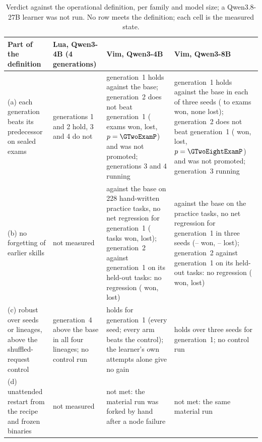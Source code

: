 \begin{table}[htbp]
\centering\footnotesize
\setlength{\tabcolsep}{4pt}
\begin{tabular}{@{}>{\raggedright\arraybackslash}p{36mm}>{\raggedright\arraybackslash}p{38mm}>{\raggedright\arraybackslash}p{38mm}>{\raggedright\arraybackslash}p{36mm}@{}}
\toprule
Part of the definition & Lua, Qwen3-4B (4 generations) & Vim, Qwen3-4B & Vim, Qwen3-8B \\
\midrule
(a) each generation beats its predecessor on sealed exams & generations 1 and 2 hold, 3 and 4 do not & generation~1 holds
against the base; generation~2 does not beat generation~1 (\GTwoExamWins{} exams won, \GTwoExamLosses{} lost, $p=\GTwoExamP$)
and was not promoted; generations 3 and 4 running & generation~1 holds against the base in each of three seeds
(\LoopEightGOneWins{} to \LoopEightRepOneWins{} exams won, none lost); generation~2 does not beat generation~1
(\GTwoEightExamWins{} won, \GTwoEightExamLosses{} lost, $p=\GTwoEightExamP$) and was not promoted; generation~3 running \\
(b) no forgetting of earlier skills & not measured & against the base on 228 hand-written practice tasks, no net regression for generation~1 (\RetainWins{} tasks won, \RetainLosses{} lost); generation~2 against
generation~1 on its held-out tasks: no regression (\GTwoForgetWins{} won, \GTwoForgetLosses{} lost) & against the base on the
practice tasks, no net regression for generation~1 in three seeds (\RetainEightMinWins{}--\RetainEightMaxWins{} won,
\RetainEightMinLosses{}--\RetainEightMaxLosses{} lost); generation~2 against generation~1 on its held-out tasks: no
regression (\GTwoEightForgetWins{} won, \GTwoEightForgetLosses{} lost) \\
(c) robust over seeds or lineages, above the shuffled-request control & generation~4 above the base in all four lineages; no
control run & holds for generation~1 (every seed; every arm beats the control); the learner's own attempts alone give no gain
& holds over three seeds for generation~1; no control run \\
(d) unattended restart from the recipe and frozen binaries & not measured & not met: the material run was forked by hand
after a node failure & not met: the same material run \\
\bottomrule
\end{tabular}
\caption{Verdict against the operational definition, per family and model size; a Qwen3.8-27B learner was not run. No row
meets the definition; each cell is the measured state.}\label{tab:verdict}
\end{table}

